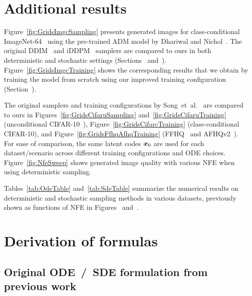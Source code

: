 \setcounter{figure}{5}    %
\setcounter{equation}{8}  %
\setcounter{table}{2}     %
\setcounter{algorithm}{2} %

\section{Additional results}
\label{app:results}

\figGridsImgcSampling
\figGridsImgcTraining
\figGridsCifaruSampling
\figGridsCifaruTraining
\figGridsCifarcTraining
\figGridsFfhqAfhqTraining
\figNfeSweep
\afterpage{\tabOdeTable}
\afterpage{\tabSdeTable}

{
Figure~\ref{fig:GridsImgcSampling} presents generated images for class-conditional ImageNet-64~\cite{Deng2009imagenet} using the pre-trained ADM model by Dhariwal and Nichol~\cite{Dhariwal2021}.
The original DDIM~\cite{Song2020ddim} and iDDPM~\cite{Nichol2021a} samplers are compared to ours in both deterministic and stochastic settings (Sections~ and~).
Figure~\ref{fig:GridsImgcTraining} shows the corresponding results that we obtain by training the model from scratch using our improved training configuration (Section~).
}

{
The original samplers and training configurations by Song~et~al.~\cite{Song2021sde} are compared to ours in
  Figures~\ref{fig:GridsCifaruSampling} and~\ref{fig:GridsCifaruTraining} (unconditional CIFAR-10~\cite{Krizhevsky2009cifar}),
  Figure~\ref{fig:GridsCifarcTraining} (class-conditional CIFAR-10),
  and Figure~\ref{fig:GridsFfhqAfhqTraining} (FFHQ~\cite{Karras2018stylegan} and AFHQv2~\cite{Choi2020afhq}).
}
For ease of comparison, the same latent codes $\boldsymbol{x}_0$ are used for each dataset/scenario across different training configurations and ODE choices.
Figure~\ref{fig:NfeSweep} shows generated image quality with various NFE when using deterministic sampling.

Tables~\ref{tab:OdeTable} and~\ref{tab:SdeTable} summarize the numerical results on deterministic and stochastic sampling methods in various datasets, previously shown as functions of NFE in Figures~ and~.

\section{Derivation of formulas}
\label{app:formulas}

\subsection{Original ODE~/~SDE formulation from previous work}
\label{app:originalode}

